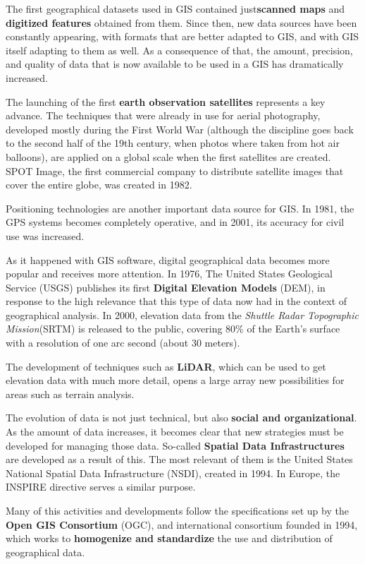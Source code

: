 The first geographical datasets used in GIS contained just\textbf{scanned maps} and \textbf{digitized features} obtained from them. Since then, new data sources have been constantly appearing, with formats that are better adapted to GIS, and with GIS itself adapting to them as well. As a consequence of that, the amount, precision, and quality of data that is now available to be used in a GIS has dramatically increased.

The launching of the first \textbf{earth observation satellites} represents a key advance. The techniques that were already in use for aerial photography, developed mostly during the First World War (although the discipline goes back to the second half of the 19th century, when photos where taken from hot air balloons), are applied on a global scale when the first satellites are created. SPOT Image, the first commercial company to distribute satellite images that cover the entire globe, was created in 1982.

Positioning technologies are another important data source for GIS. In 1981, the GPS systems becomes completely operative, and in 2001, its accuracy for civil use was increased.

As it happened with GIS software, digital geographical data becomes more popular and receives more attention. In 1976, The United States Geological Service (USGS) publishes its first \textbf{Digital Elevation Models} (DEM), in response to the high relevance that this type of data now had in the context of geographical analysis. In 2000, elevation data from the \emph{Shuttle Radar Topographic Mission}(SRTM) is released to the public, covering 80\% of the Earth's surface with a resolution of one arc second (about 30 meters).

The development of techniques such as \textbf{LiDAR}, which can be used to get elevation data with much more detail, opens a large array new possibilities for areas such as terrain analysis.

The evolution of data is not just technical, but also \textbf{social and organizational}. As the amount of data increases, it becomes clear that new strategies must be developed for managing those data. So-called \textbf{Spatial Data Infrastructures} are developed as a result of this. The most relevant of them is the United States National Spatial Data Infrastructure (NSDI), created in 1994. In Europe, the INSPIRE directive serves a similar purpose.

Many of this activities and developments follow the specifications set up by the \textbf{Open GIS Consortium} (OGC), and international consortium founded in 1994, which works to \textbf{homogenize and standardize} the use and distribution of geographical data.

